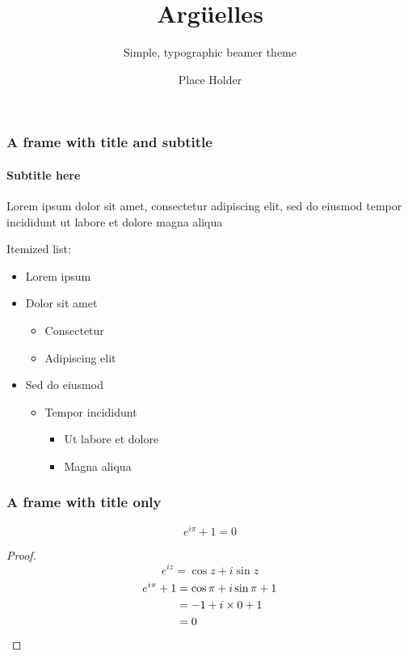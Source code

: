 \documentclass[compress,12pt]{beamer}
\title{Argüelles}
\subtitle{Simple, typographic beamer theme}
\date{}
\author{Place Holder}
\institute{University of \TeX}
\begin{document}
\frame[plain]{\titlepage}


\begin{frame}
      \frametitle{A frame with title and subtitle}
      \framesubtitle{Subtitle here}
      Lorem ipsum dolor sit amet, consectetur adipiscing elit, sed do eiusmod tempor incididunt ut labore et dolore magna aliqua \par
      Itemized list:
      \begin{itemize}
            \item Lorem ipsum
            \item Dolor sit amet
                  \begin{itemize}
                        \item Consectetur
                        \item Adipiscing elit
                  \end{itemize}
            \item Sed do eiusmod
                  \begin{itemize}
                        \item Tempor incididunt
                              \begin{itemize}
                                    \item Ut labore et dolore
                                    \item Magna aliqua
                              \end{itemize}
                  \end{itemize}
      \end{itemize}
\end{frame}

\begin{frame}
      \frametitle{A frame with title only}
      \begin{theorem}
            \[e^{i\pi}+1=0\]
            \begin{proof}
                  \begin{equation*}
                        e^{iz}=\cos{z}+i\sin{z}
                  \end{equation*}
                  \begin{align*}
                        e^{i\pi}+1 & \null=\cos\pi+i\sin\pi+1 \\
                                   & \null=-1+i\times0+1      \\
                                   & \null=0
                  \end{align*}
            \end{proof}
      \end{theorem}
\end{frame}
\end{document}
